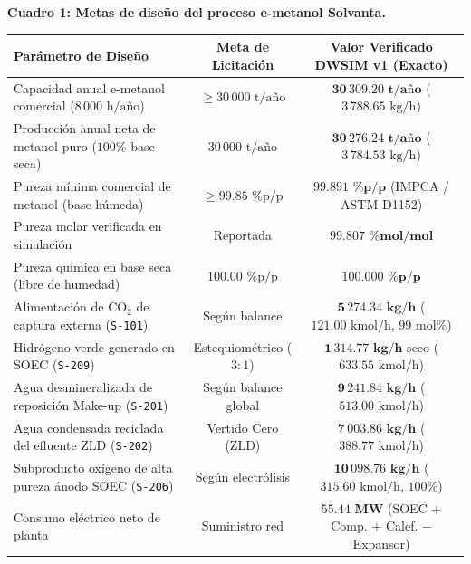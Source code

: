 \documentclass[11pt,letterpaper]{article}
\begin{document}
\begin{center}
\small
\textbf{Cuadro 1: Metas de diseño del proceso e-metanol Solvanta.}\\[3pt]
\begin{tabularx}{\textwidth}{Xcc}
\toprule
\textbf{Parámetro de Diseño} & \textbf{Meta de Licitación} & \textbf{Valor Verificado DWSIM v1 (Exacto)} \\
\midrule
Capacidad anual e-metanol comercial ($8\,000\text{ h/año}$) & $\ge 30\,000\text{ t/año}$ & $\mathbf{30\,309.20\text{ t/año}}$ ($3\,788.65\text{ kg/h}$) \\
Producción anual neta de metanol puro ($100\%$ base seca) & $30\,000\text{ t/año}$ & $\mathbf{30\,276.24\text{ t/año}}$ ($3\,784.53\text{ kg/h}$) \\
Pureza mínima comercial de metanol (base húmeda) & $\ge 99.85\text{ \% p/p}$ & $\mathbf{99.891\text{ \% p/p}}$ (IMPCA / ASTM D1152) \\
Pureza molar verificada en simulación & Reportada & $\mathbf{99.807\text{ \% mol/mol}}$ \\
Pureza química en base seca (libre de humedad) & $100.00\text{ \% p/p}$ & $\mathbf{100.000\text{ \% p/p}}$ \\
Alimentación de $\text{CO}_2$ de captura externa (\texttt{S-101}) & Según balance & $\mathbf{5\,274.34\text{ kg/h}}$ ($121.00\text{ kmol/h}$, $99\text{ mol\%}$) \\
Hidrógeno verde generado en SOEC (\texttt{S-209}) & Estequiométrico ($3:1$) & $\mathbf{1\,314.77\text{ kg/h}}$ seco ($633.55\text{ kmol/h}$) \\
Agua desmineralizada de reposición Make-up (\texttt{S-201})& Según balance global & $\mathbf{9\,241.84\text{ kg/h}}$ ($513.00\text{ kmol/h}$) \\
Agua condensada reciclada del efluente ZLD (\texttt{S-202})& Vertido Cero (ZLD) & $\mathbf{7\,003.86\text{ kg/h}}$ ($388.77\text{ kmol/h}$) \\
Subproducto oxígeno de alta pureza ánodo SOEC (\texttt{S-206}) & Según electrólisis & $\mathbf{10\,098.76\text{ kg/h}}$ ($315.60\text{ kmol/h}$, $100\%$) \\
Consumo eléctrico neto de planta & Suministro red & $\mathbf{55.44\text{ MW}}$ (SOEC $+$ Comp. $+$ Calef. $-$ Expansor) \\
\bottomrule
\end{tabularx}
\end{center}

\clearpage

\end{document}
